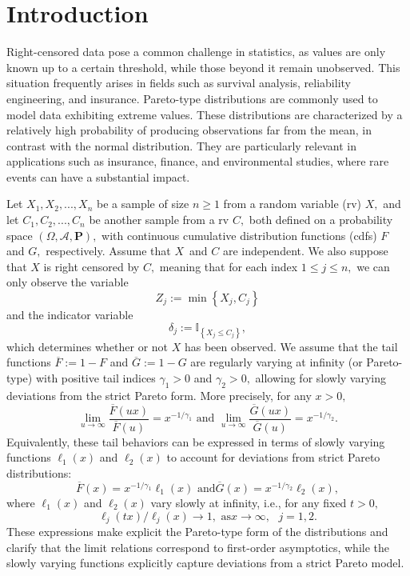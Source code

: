 \documentclass[reqno,openbib,runningheads,a4paper,12pt]{amsart}%
\begin{document}
\section{\textbf{Introduction\label{sec1}}}

\noindent Right-censored data pose a common challenge in statistics, as values
are only known up to a certain threshold, while those beyond it remain
unobserved. This situation frequently arises in fields such as survival
analysis, reliability engineering, and insurance. Pareto-type distributions
are commonly used to model data exhibiting extreme values. These distributions
are characterized by a relatively high probability of producing observations
far from the mean, in contrast with the normal distribution. They are
particularly relevant in applications such as insurance, finance, and
environmental studies, where rare events can have a substantial
impact.\smallskip\ 

\noindent Let $X_{1},X_{2},...,X_{n}$ be a sample of size $n\geq1$ from a
random variable (rv) $X,$ and let $C_{1},C_{2},...,C_{n}$ be another sample
from a rv $C,$ both defined on a probability space $\left(  \Omega
,\mathcal{A},\mathbf{P}\right)  ,$ with continuous cumulative distribution
functions (cdfs) $F$ and $G,$ respectively. Assume that $X$\ and $C$ are
independent. We also suppose that $X$ is right censored by $C,$ meaning that
for each index $1\leq j\leq n,$ we can only observe the variable
\[
Z_{j}:=\min\left\{  X_{j},C_{j}\right\}
\]
and the indicator variable
\[
\delta_{j}:=\mathbb{I}_{\left\{  X_{j}\leq C_{j}\right\}  },
\]
which determines whether or not $X$ has been observed. We assume that the tail
functions $\overline{F}:=1-F$ and $\overline{G}:=1-G$ are regularly varying at
infinity (or Pareto-type) with positive tail indices $\gamma_{1}>0$ and
$\gamma_{2}>0,$ allowing for slowly varying deviations from the strict Pareto
form. More precisely, for any $x>0,$%
\begin{equation}
\lim_{u\rightarrow\infty}\frac{\overline{F}(ux)}{\overline{F}(u)}%
=x^{-1/\gamma_{1}}\text{ and }\lim_{u\rightarrow\infty}\frac{\overline{G}%
(ux)}{\overline{G}(u)}=x^{-1/\gamma_{2}}.\label{RV}%
\end{equation}
Equivalently, these tail behaviors can be expressed in terms of slowly varying
functions $\ell_{1}\left(  x\right)  $ and $\ell_{2}\left(  x\right)  $ to
account for deviations from strict Pareto distributions:%
\begin{equation}
\overline{F}(x)=x^{-1/\gamma_{1}}\ell_{1}\left(  x\right)  \text{ and
}\overline{G}(x)=x^{-1/\gamma_{2}}\ell_{2}\left(  x\right)  ,\label{RVbis}%
\end{equation}
where $\ell_{1}\left(  x\right)  $ and $\ell_{2}\left(  x\right)  $ vary
slowly at infinity, i.e., for any fixed $t>0,$
\[
\ell_{j}\left(  tx\right)  /\ell_{j}\left(  x\right)  \rightarrow1,\text{ as
}x\rightarrow\infty,\text{ }j=1,2.
\]
These expressions make explicit the Pareto-type form of the distributions and
clarify that the limit relations correspond to first-order asymptotics, while
the slowly varying functions explicitly capture deviations from a strict
Pareto model.\medskip
\end{document}
